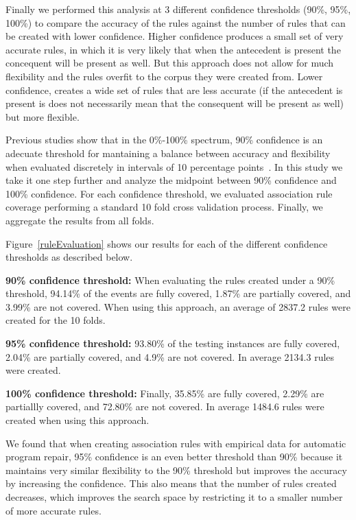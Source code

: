 \documentclass[sigconf]{acmart}
\begin{document}
Finally we performed this analysis at 3 different confidence thresholds
(90\%, 95\%, 100\%) to compare the accuracy of the rules against the 
number of rules that can be created with lower confidence. 
Higher confidence produces a small set of very
accurate rules, in which it is very likely that when the antecedent
is present the concequent will be present as well. But this approach
does not allow for much flexibility and the rules overfit to the corpus 
they were created from. Lower 
confidence, creates a wide set of rules that are less accurate (if
the antecedent is present is does not necessarily mean that the 
consequent will be present as well) but more flexible. 

Previous studies show that in the 0\%-100\% spectrum, 
90\% confidence is an adecuate threshold 
for mantaining a balance between accuracy and flexibility when evaluated
discretely in intervals of 10 percentage points~\cite{Soto18}.
In this study we take it one step further and analyze the midpoint between 90\%
confidence and 100\% confidence.
For each confidence
threshold, we evaluated association rule coverage performing
a standard 10 fold cross validation process. Finally, we aggregate the results
from all folds.

Figure~\ref{ruleEvaluation} shows our results for each of the 
different confidence thresholds as described below.

\noindent\textbf{90\% confidence threshold:}
When evaluating the rules created under a 90\% threshold, 94.14\% of the 
events are fully covered, 1.87\% are partially covered, and 3.99\% are
not covered. When using this approach, an average of 2837.2 rules were
created for the 10 folds.

\noindent\textbf{95\% confidence threshold:}
93.80\% of the testing instances are fully covered, 2.04\% are
partially covered, and 4.9\% are not covered. In average 2134.3 rules
were created.

\noindent\textbf{100\% confidence threshold:}
Finally, 35.85\% are fully
covered, 2.29\% are partiallly covered, and 72.80\% are not covered.
In average 1484.6 rules were created when using this approach.

We found that when creating association
rules with empirical data for automatic program repair, 95\% confidence
is an even better threshold than 90\% because it maintains very similar flexibility 
to the 90\% threshold but improves the accuracy by increasing the confidence. 
This also means that the number of rules created decreases, which improves
the search space by restricting it to a smaller number of more accurate rules.
 
\end{document}
